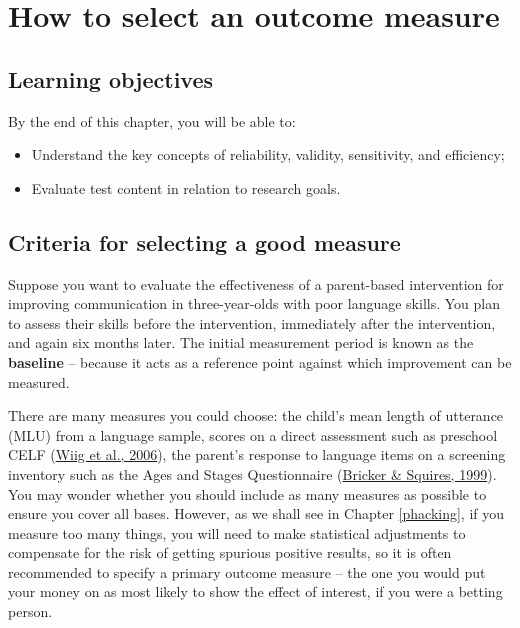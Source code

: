 \documentclass{krantz}
\begin{document}
\hypertarget{reliability}{%
\chapter{How to select an outcome measure}\label{reliability}}

\hypertarget{learning-objectives-2}{%
\section{Learning objectives}\label{learning-objectives-2}}

By the end of this chapter, you will be able to:

\begin{itemize}
\item
  Understand the key concepts of reliability, validity, sensitivity, and efficiency;
\item
  Evaluate test content in relation to research goals.
\end{itemize}

\hypertarget{criteria-for-selecting-a-good-measure}{%
\section{Criteria for selecting a good measure}\label{criteria-for-selecting-a-good-measure}}

Suppose you want to evaluate the effectiveness of a parent-based intervention for improving communication in three-year-olds with poor language skills. You plan to assess their skills before the intervention, immediately after the intervention, and again six months later. The initial measurement period is known as the \textbf{baseline} --  because it acts as a reference point against which improvement can be measured.

There are many measures you could choose: the child's mean length of utterance (MLU) from a language sample, scores on a direct assessment such as preschool CELF (\protect\hyperlink{ref-wiig2006}{Wiig et al., 2006}), the parent's response to language items on a screening inventory such as the Ages and Stages Questionnaire (\protect\hyperlink{ref-bricker1999}{Bricker \& Squires, 1999}). You may wonder whether you should include as many measures as possible to ensure you cover all bases. However, as we shall see in Chapter \ref{phacking}, if you measure too many things, you will need to make statistical adjustments to compensate for the risk of getting spurious positive results, so it is often recommended to specify a primary outcome measure -- the one you would put your money on as most likely to show the effect of interest, if you were a betting person.
\end{document}
